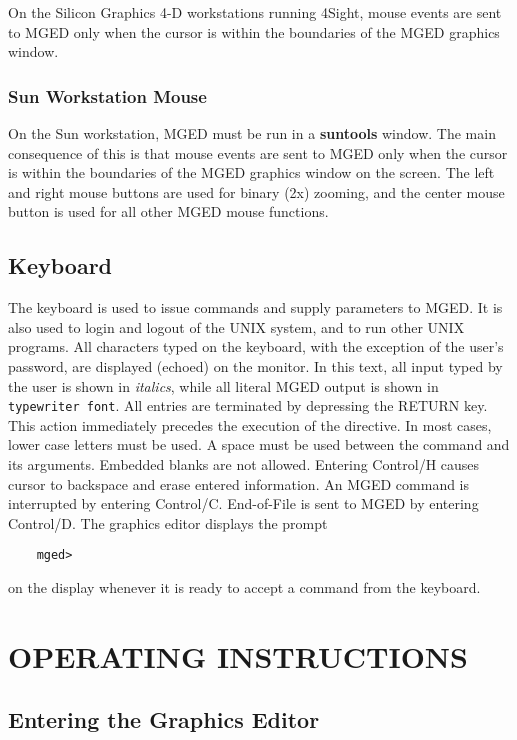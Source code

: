 On the Silicon Graphics 4-D workstations running 4Sight,
mouse events are sent to MGED only when the cursor is within the
boundaries of the MGED graphics window.

\subsection{Sun Workstation Mouse}

On the Sun workstation, MGED must be run in a {\bf suntools} window.
The main consequence of this is that mouse events are sent to MGED
only when the cursor is within the boundaries of the MGED graphics window
on the screen.
The left and right mouse buttons are used for binary (2x) zooming,
and the center mouse button is used for all other MGED mouse functions.

\section{Keyboard}

The keyboard is used to issue commands and supply parameters to MGED.
It is also used to login and logout of the UNIX system, and to
run other UNIX programs.
All characters typed on the keyboard,
with the exception of the user's password, are displayed (echoed) on the
monitor.
In this text, all input typed by the user is
shown in {\em italics}, while all literal MGED output
is shown in {\tt typewriter font}.
All entries are
terminated by depressing the RETURN key.
This action immediately precedes the execution of the directive.
In most cases, lower case letters
must be used.  A space must be used between the command and its 
arguments.
Embedded blanks are not allowed.
Entering Control/H causes cursor to backspace and erase entered
information.
An MGED command is interrupted by entering Control/C.
End-of-File is sent to MGED by entering Control/D.
The graphics editor displays the prompt
\begin{verbatim}
	mged>
\end{verbatim}
on the display whenever it is ready to accept a command from the keyboard.

\chapter{OPERATING INSTRUCTIONS}

\section{Entering the Graphics Editor}

